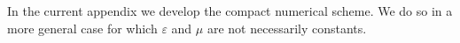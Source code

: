 \documentclass[12pt,reqno]{amsart}
\theoremstyle{definition}
\numberwithin{equation}{section}
\begin{document}

			\newpage
			\section{}\label{appendxib}
			In the current appendix we develop the compact numerical scheme.
			We do so in a more general case  for which $\varepsilon$ and $\mu$ are not necessarily constants.
			 
\end{document}
